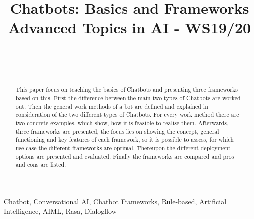 \documentclass[10pt,final,journal,a4paper,oneside,twocolumn]{IEEEtran}
\begin{document}
\title{
	Chatbots: Basics and Frameworks\\
	\small Advanced Topics in AI - WS19/20
}

\author{
\\
\and
{}\\
}
\maketitle

\begin{abstract}
This paper focus on teaching the basics of Chatbots and presenting three frameworks based on this. First the difference between the main two types of Chatbots are worked out. Then the general work methods of a bot are defined and explained in consideration of the two different types of Chatbots. For every work method there are two concrete examples, which show, how it is feasible to realise them. Afterwards, three frameworks are presented, the focus lies on showing the concept, general functioning and key features of each framework, so it is possible to assess, for which use case the different frameworks are optimal. Thereupon the different deployment options are presented and evaluated. Finally the frameworks are compared and pros and cons are listed.
\end{abstract}

\begin{IEEEkeywords}
Chatbot, Conversational AI, Chatbot Frameworks, Rule-based, Artificial Intelligence, AIML, Rasa, Dialogflow
\end{IEEEkeywords}
\end{document}
